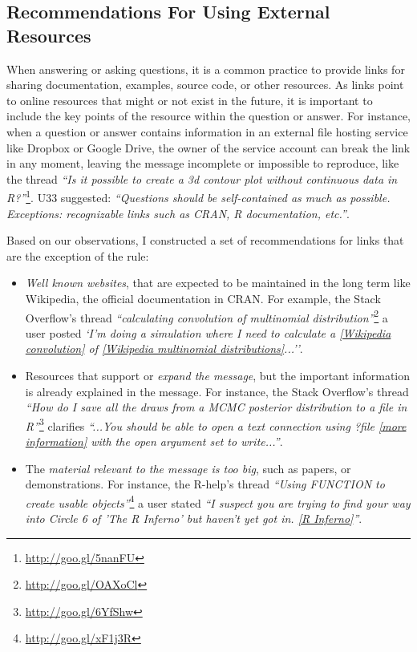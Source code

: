 \documentclass{sig-alternate-05-2015}
\begin{document}
\subsection{Recommendations For Using External Resources}

	When answering or asking questions, it is a common practice to provide links for sharing documentation, examples, source code, or other resources.
	As links point to online resources that might or not exist in the future, it is important to include the key points of the resource within the question or answer.
	For instance, when a question or answer contains information in an external file hosting service like Dropbox or Google Drive, the owner of the service account can break the link in any moment, leaving the message incomplete or impossible to reproduce, like the thread \textit{``Is it possible to create a 3d contour plot without continuous data in R?''}\footnote{\url{http://goo.gl/5nanFU}}.
	U33 suggested: \textit{``Questions should be self-contained as much as possible. Exceptions: recognizable links such as CRAN, R documentation, etc.''}.

	Based on our observations, I constructed a set of recommendations for links that are the exception of the rule:

	\begin{itemize}
		\item \emph{Well known websites}, that are expected to be maintained in the long term like Wikipedia, the official documentation in CRAN.
		For example, the Stack Overflow's thread \textit{``calculating convolution of multinomial distribution''}\footnote{\url{http://goo.gl/OAXoCl}} a user posted \textit{`I'm doing a simulation where I need to calculate a \href{https://en.wikipedia.org/wiki/Convolution_of_probability_distributions}{[Wikipedia convolution]} of \href{https://en.wikipedia.org/wiki/Multinomial_distribution}{[Wikipedia multinomial distributions]}...''}.

		\item Resources that support or \emph{expand the message}, but the important information is already explained in the message.
		For instance, the Stack Overflow's thread \textit{``How do I save all the draws from a MCMC posterior distribution to a file in R''}\footnote{\url{http://goo.gl/6YfShw}} clarifies \textit{``...You should be able to open a text connection using ?file \href{http://stat.ethz.ch/R-manual/R-devel/library/base/html/connections.html}{[more information]} with the open argument set to write...''}.

		\item The \emph{material relevant to the message is too big}, such as papers, or demonstrations.
		For instance, the R-help's thread \textit{``Using FUNCTION to create usable objects''}\footnote{\url{http://goo.gl/xF1j3R}} a user stated \textit{``I suspect you are trying to find your way into Circle 6 of 'The R Inferno' but haven't yet got in. \href{http://www.burns-stat.com/pages/Tutor/R\_inferno.pdf}{[R Inferno]}''}.
	\end{itemize}
\end{document}
